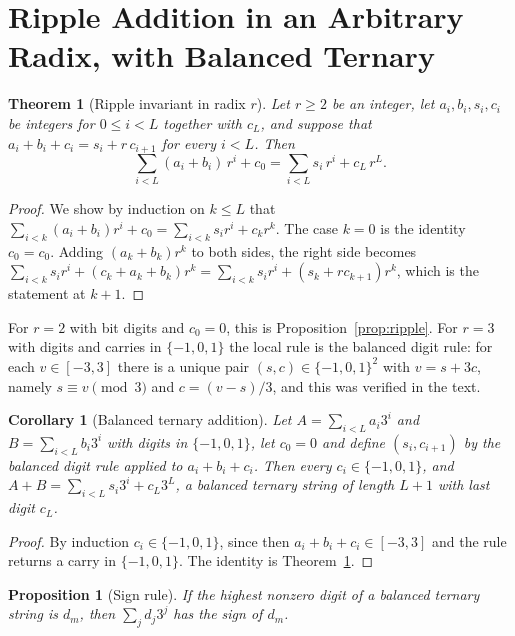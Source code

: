 \documentclass[11pt]{article}
\newtheorem{proposition}{Proposition}
\newtheorem{theorem}{Theorem}
\newtheorem{corollary}{Corollary}
\theoremstyle{definition}
\theoremstyle{remark}
\begin{document}
\section{Ripple Addition in an Arbitrary Radix, with Balanced Ternary}\label{app:radix}

\begin{theorem}[Ripple invariant in radix $r$]\label{thm:radix}
Let $r \ge 2$ be an integer, let $a_i, b_i, s_i, c_i$ be integers for $0 \le i < L$ together with $c_L$, and suppose that $a_i + b_i + c_i = s_i + r\,c_{i+1}$ for every $i < L$. Then
\[
\sum_{i<L} (a_i + b_i)\, r^{i} + c_0 = \sum_{i<L} s_i\, r^{i} + c_L\, r^{L}.
\]
\end{theorem}

\begin{proof}
We show by induction on $k \le L$ that $\sum_{i<k}(a_i + b_i) r^{i} + c_0 = \sum_{i<k} s_i r^{i} + c_k r^{k}$. The case $k = 0$ is the identity $c_0 = c_0$. Adding $(a_k + b_k) r^{k}$ to both sides, the right side becomes $\sum_{i<k} s_i r^i + (c_k + a_k + b_k) r^{k} = \sum_{i<k} s_i r^i + (s_k + r c_{k+1}) r^{k}$, which is the statement at $k+1$.
\end{proof}

For $r = 2$ with bit digits and $c_0 = 0$, this is Proposition~\ref{prop:ripple}. For $r = 3$ with digits and carries in $\{-1, 0, 1\}$ the local rule is the balanced digit rule: for each $v \in [-3, 3]$ there is a unique pair $(s, c) \in \{-1,0,1\}^2$ with $v = s + 3c$, namely $s \equiv v \pmod 3$ and $c = (v - s)/3$, and this was verified in the text.

\begin{corollary}[Balanced ternary addition]\label{cor:bt}
Let $A = \sum_{i<L} a_i 3^i$ and $B = \sum_{i<L} b_i 3^i$ with digits in $\{-1,0,1\}$, let $c_0 = 0$ and define $(s_i, c_{i+1})$ by the balanced digit rule applied to $a_i + b_i + c_i$. Then every $c_i \in \{-1,0,1\}$, and $A + B = \sum_{i<L} s_i 3^i + c_L 3^{L}$, a balanced ternary string of length $L+1$ with last digit $c_L$.
\end{corollary}

\begin{proof}
By induction $c_i \in \{-1,0,1\}$, since then $a_i + b_i + c_i \in [-3, 3]$ and the rule returns a carry in $\{-1,0,1\}$. The identity is Theorem~\ref{thm:radix}.
\end{proof}

\begin{proposition}[Sign rule]\label{prop:signrule}
If the highest nonzero digit of a balanced ternary string is $d_m$, then $\sum_j d_j 3^j$ has the sign of $d_m$.
\end{proposition}
\end{document}
